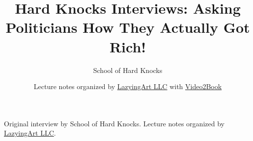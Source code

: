 \documentclass[11pt,oneside]{book}
\begin{document}
\frontmatter
\title{Hard Knocks Interviews: Asking Politicians How They Actually Got Rich!}
\author{School of Hard Knocks}
\date{Lecture notes organized by \href{https://lazying.art}{LazyingArt LLC} with \href{https://github.com/lachlanchen/Video2Book}{Video2Book}}
\maketitle
\begin{center}
\small Original interview by School of Hard Knocks. Lecture notes organized by \href{https://lazying.art}{LazyingArt LLC}.
\end{center}
\clearpage
\mainmatter

\end{document}
